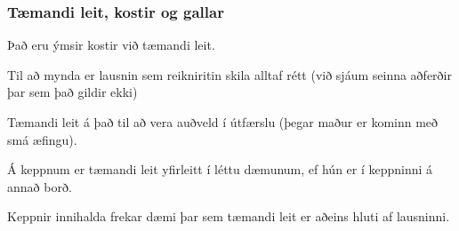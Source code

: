 {
	\frametitle{Tæmandi leit, kostir og gallar}
	{
		\item<1-> Það eru ýmsir kostir við tæmandi leit.
		\item<2-> Til að mynda er lausnin sem reikniritin skila alltaf rétt (við sjáum seinna aðferðir þar sem það gildir ekki)
		\item<3-> Tæmandi leit á það til að vera auðveld í útfærslu (þegar maður er kominn með smá æfingu).
		\item<4-> Á keppnum er tæmandi leit yfirleitt í léttu dæmunum, ef hún er í keppninni á annað borð.
		\item<5-> Keppnir innihalda frekar dæmi þar sem tæmandi leit er aðeins hluti af lausninni.
	}
}

{
}


